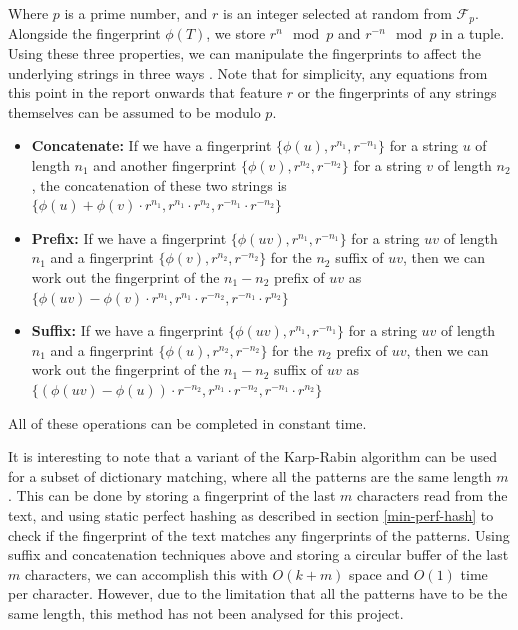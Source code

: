 \documentclass[ %
                    author={Dominic Joseph Moylett},
                    degree={MEng},
                     title={Dictionary Matching with Fingerprints},
                  subtitle={An Empirical Analysis},
                      type={research},
                      year={2015} ]{dissertation}
\begin{document}
Where $p$ is a prime number, and $r$ is an integer selected at random from $\mathcal{F}_p$. Alongside the fingerprint $\phi(T)$, we store $r^n \mod p$ and $r^{-n} \mod p$ in a tuple. Using these three properties, we can manipulate the fingerprints to affect the underlying strings in three ways \cite{5438620}. Note that for simplicity, any equations from this point in the report onwards that feature $r$ or the fingerprints of any strings themselves can be assumed to be modulo $p$.

\begin{itemize}
  \item \textbf{Concatenate:} If we have a fingerprint $\{\phi(u), r^{n_1}, r^{-n_1}\}$ for a string $u$ of length $n_1$ and another fingerprint $\{\phi(v), r^{n_2}, r^{-n_2}\}$ for a string $v$ of length $n_2$, the concatenation of these two strings is $\{\phi(u) + \phi(v)\cdot r^{n_1}, r^{n_1} \cdot r^{n_2}, r^{-n_1} \cdot r^{-n_2}\}$
  \item \textbf{Prefix:} If we have a fingerprint $\{\phi(uv), r^{n_1}, r^{-n_1}\}$ for a string $uv$ of length $n_1$ and a fingerprint $\{\phi(v), r^{n_2}, r^{-n_2}\}$ for the $n_2$ suffix of $uv$, then we can work out the fingerprint of the $n_1 - n_2$ prefix of $uv$ as $\{\phi(uv) - \phi(v)\cdot r^{n_1}, r^{n_1} \cdot r^{-n_2}, r^{-n_1} \cdot r^{n_2}\}$
  \item \textbf{Suffix:} If we have a fingerprint $\{\phi(uv), r^{n_1}, r^{-n_1}\}$ for a string $uv$ of length $n_1$ and a fingerprint $\{\phi(u), r^{n_2}, r^{-n_2}\}$ for the $n_2$ prefix of $uv$, then we can work out the fingerprint of the $n_1 - n_2$ suffix of $uv$ as $\{(\phi(uv) - \phi(u))\cdot r^{-n_2}, r^{n_1} \cdot r^{-n_2}, r^{-n_1} \cdot r^{n_2}\}$
\end{itemize}

All of these operations can be completed in constant time.

It is interesting to note that a variant of the Karp-Rabin algorithm can be used for a subset of dictionary matching, where all the patterns are the same length $m$ \cite{candan:data}. This can be done by storing a fingerprint of the last $m$ characters read from the text, and using static perfect hashing as described in section \ref{min-perf-hash} to check if the fingerprint of the text matches any fingerprints of the patterns. Using suffix and concatenation techniques above and storing a circular buffer of the last $m$ characters, we can accomplish this with $O(k + m)$ space and $O(1)$ time per character. However, due to the limitation that all the patterns have to be the same length, this method has not been analysed for this project.
\end{document}
